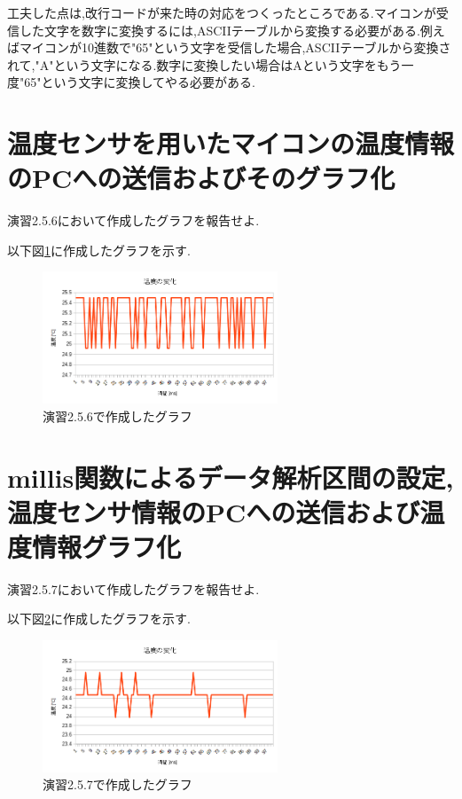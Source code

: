 \documentclass{jarticle}
\begin{document}
工夫した点は,改行コードが来た時の対応をつくったところである.マイコンが受信した文字を数字に変換するには,ASCIIテーブルから変換する必要がある.例えばマイコンが10進数で"65"という文字を受信した場合,ASCIIテーブルから変換されて,"A"という文字になる.数字に変換したい場合はAという文字をもう一度"65"という文字に変換してやる必要がある.

\section{温度センサを用いたマイコンの温度情報のPCへの送信およびそのグラフ化}
演習2.5.6において作成したグラフを報告せよ.

以下図\ref{fig:enshu2-5-6}に作成したグラフを示す.

\begin{figure}[H]
\begin{center}
\includegraphics[width=7.0cm]{images/enshu2-5-6.png}
\caption{演習2.5.6で作成したグラフ}
\label{fig:enshu2-5-6}
\end{center}
\end{figure}

\section{millis関数によるデータ解析区間の設定,温度センサ情報のPCへの送信および温度情報グラフ化}
演習2.5.7において作成したグラフを報告せよ.

以下図\ref{fig:enshu2-5-7}に作成したグラフを示す.

\begin{figure}[H]
\begin{center}
\includegraphics[width=7.0cm]{images/enshu2-5-7.png}
\caption{演習2.5.7で作成したグラフ}
\label{fig:enshu2-5-7}
\end{center}
\end{figure}
\end{document}
